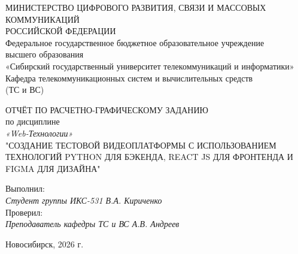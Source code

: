 \documentclass[a4paper,14pt,oneside,openany]{memoir}
\begin{document}
\thispagestyle{empty}
\begin{center}
    МИНИСТЕРСТВО ЦИФРОВОГО РАЗВИТИЯ, СВЯЗИ И МАССОВЫХ КОММУНИКАЦИЙ \\
    РОССИЙСКОЙ ФЕДЕРАЦИИ \vspace{20pt} \\
    Федеральное государственное бюджетное образовательное учреждение \\
    высшего образования \\
    «Сибирский государственный университет телекоммуникаций и информатики» \vspace{20pt} \\
    Кафедра телекоммуникационных систем и вычислительных средств \\
    (ТС и ВС)
\end{center}
\vfill
\begin{center}
    {\normalfont ОТЧЁТ ПО РАСЧЕТНО-ГРАФИЧЕСКОМУ ЗАДАНИЮ} \vspace{10pt} \\
    по дисциплине \\
    {\itshape «Web-Технологии»} \vspace{20pt} \\
    {\normalfont\uppercase{"Создание тестовой видеоплатформы с использованием технологий Python для бэкенда, React JS для фронтенда и Figma для дизайна"}}
\end{center}
\vfill
\noindent Выполнил: \\ {\itshape Студент группы ИКС-531 \hfill В.А. Кириченко} \vspace{10pt} \\
\noindent Проверил: \\ {\itshape Преподаватель кафедры ТС и ВС \hfill А.В. Андреев}
\vfill
\begin{center} Новосибирск, 2026 г. \end{center}

\newpage
\OnehalfSpacing*
\tableofcontents
\newpage
\setcounter{page}{3}

\end{document}
